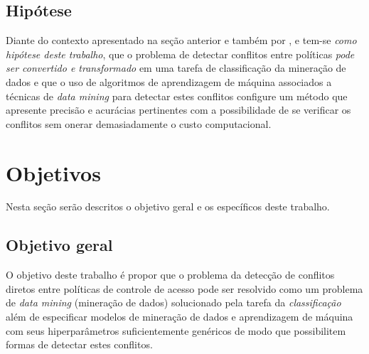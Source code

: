 \documentclass[
	12pt,				%
	openright,			%
	oneside,			%
	a4paper,			%
	english,			%
	french,				%
	spanish,			%
	brazil				%
	]{abntex2}
\begin{document}

\subsection{Hipótese}\label{hipótese}
Diante do contexto apresentado na seção anterior e também por ,  e  tem-se \textit{como hipótese deste trabalho}, que o problema de detectar conflitos entre políticas\textit{ pode ser convertido e transformado} em uma tarefa de classificação da mineração de dados e que o uso de algoritmos de aprendizagem de máquina associados a técnicas de \textit{data mining} para detectar estes conflitos configure um método que apresente precisão e acurácias pertinentes com a possibilidade de se verificar os conflitos sem onerar demasiadamente o custo computacional.

\section{Objetivos}\label{objetivos}
Nesta seção serão descritos o objetivo geral e os específicos deste trabalho.
\subsection{Objetivo geral}\label{objetivo_geral}
O objetivo deste trabalho é propor que o problema da detecção de conflitos diretos entre políticas de controle de acesso pode ser resolvido como um problema de \textit{data mining} (mineração de dados) solucionado pela tarefa da \textit{classificação} além de especificar modelos de mineração de dados e aprendizagem de máquina com seus hiperparâmetros suficientemente genéricos de modo que possibilitem formas de detectar estes conflitos.%
\end{document}
